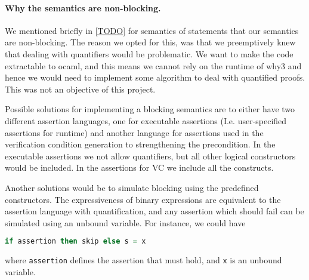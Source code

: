 \paragraph{Why the semantics are non-blocking.}
We mentioned briefly in \autoref{TODO} for semantics of statements that our semantics are non-blocking.
The reason we opted for this, was that we preemptively knew that dealing with quantifiers would be problematic.
We want to make the code extractable to ocaml, and this means we cannot rely on the runtime of why3 and hence
we would need to implement some algorithm to deal with quantified proofs.
This was not an objective of this project.

Possible solutions for implementing a blocking semantics are to either have two different assertion languages,
one for executable assertions (I.e. user-specified assertions for runtime) and another language for
assertions used in the verification condition generation to strengthening the precondition.
In the executable assertions we not allow quantifiers, but all other logical constructors would be included.
In the assertions for VC we include all the constructs.

Another solutions would be to simulate blocking using the predefined constructors.
The expressiveness of binary expressions are equivalent to the assertion language with quantification,
and any assertion which should fail can be simulated using an unbound variable.
For instance, we could have

\begin{lstlisting}[language=haskell]
if assertion then skip else s = x
\end{lstlisting}

where \texttt{assertion} defines the assertion that must hold, and \texttt{x} is an unbound variable.


